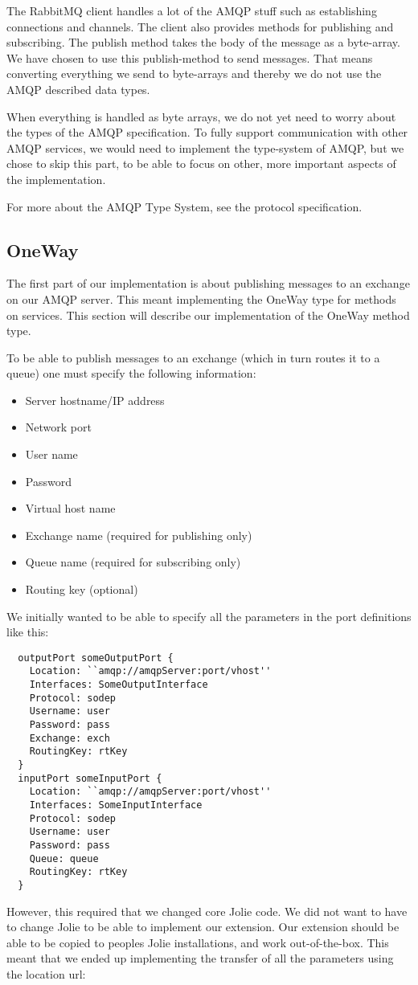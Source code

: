 The RabbitMQ client handles a lot of the AMQP stuff such as establishing connections and channels. The client also provides methods for publishing and subscribing. The publish method takes the body of the message as a byte-array. We have chosen to use this publish-method to send messages. That means converting everything we send to byte-arrays and thereby we do not use the AMQP described data types.

When everything is handled as byte arrays, we do not yet need to worry about the types of the AMQP specification. To fully support communication with other AMQP services, we would need to implement the type-system of AMQP, but we chose to skip this part, to be able to focus on other, more important aspects of the implementation.

For more about the AMQP Type System, see the protocol specification\cite{AmqpTypes}.

\subsection{OneWay}
The first part of our implementation is about publishing messages to an exchange on our AMQP server. This meant implementing the OneWay type for methods on services. This section will describe our implementation of the OneWay method type.

To be able to publish messages to an exchange (which in turn routes it to a queue) one must specify the following information:
\begin{itemize}
\item Server hostname/IP address
\item Network port
\item User name
\item Password
\item Virtual host name
\item Exchange name (required for publishing only)
\item Queue name (required for subscribing only)
\item Routing key (optional)
\end{itemize}

We initially wanted to be able to specify all the parameters in the port definitions like this:

\begin{lstlisting}
  outputPort someOutputPort {
    Location: ``amqp://amqpServer:port/vhost''
    Interfaces: SomeOutputInterface
    Protocol: sodep
    Username: user
    Password: pass
    Exchange: exch
    RoutingKey: rtKey
  }
  inputPort someInputPort {
    Location: ``amqp://amqpServer:port/vhost''
    Interfaces: SomeInputInterface
    Protocol: sodep
    Username: user
    Password: pass
    Queue: queue
    RoutingKey: rtKey
  }
\end{lstlisting}
However, this required that we changed core Jolie code. We did not want to have to change Jolie to be able to implement our extension. Our extension should be able to be copied to peoples Jolie installations, and work out-of-the-box. This meant that we ended up implementing the transfer of all the parameters using the location url:

